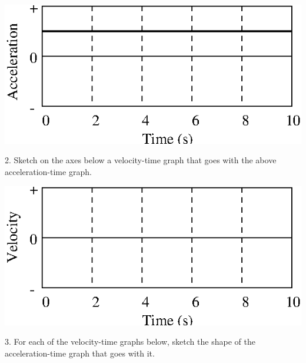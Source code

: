\vspace{0.3cm}
{\par\raggedright \includegraphics{changing/changing_fig6.eps} \par}
\vspace{1.3cm}

2. Sketch on the axes below a velocity-time graph that goes with the above acceleration-time
graph.

\vspace{0.3cm}
{\par\centering \includegraphics{changing/changing_fig7.eps} \par}
\vspace{1.3cm}

3. For each of the velocity-time graphs below, sketch the shape of the acceleration-time
graph that goes with it.

